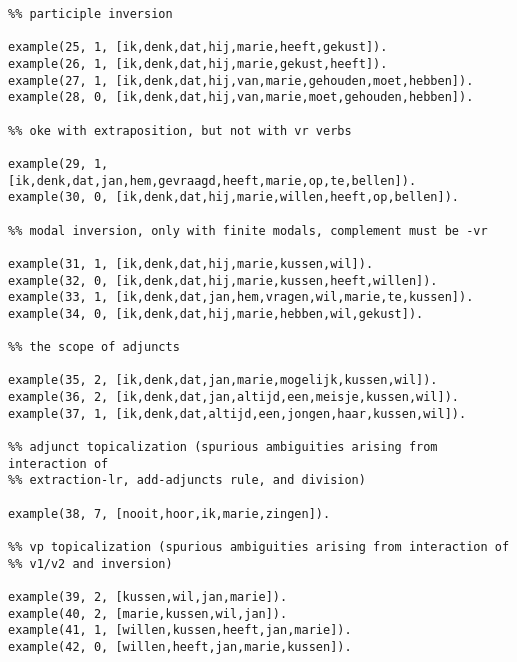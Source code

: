 \begin{verbatim}
%% participle inversion 

example(25, 1, [ik,denk,dat,hij,marie,heeft,gekust]).
example(26, 1, [ik,denk,dat,hij,marie,gekust,heeft]).
example(27, 1, [ik,denk,dat,hij,van,marie,gehouden,moet,hebben]).
example(28, 0, [ik,denk,dat,hij,van,marie,moet,gehouden,hebben]).

%% oke with extraposition, but not with vr verbs

example(29, 1, [ik,denk,dat,jan,hem,gevraagd,heeft,marie,op,te,bellen]).
example(30, 0, [ik,denk,dat,hij,marie,willen,heeft,op,bellen]).

%% modal inversion, only with finite modals, complement must be -vr

example(31, 1, [ik,denk,dat,hij,marie,kussen,wil]).
example(32, 0, [ik,denk,dat,hij,marie,kussen,heeft,willen]).
example(33, 1, [ik,denk,dat,jan,hem,vragen,wil,marie,te,kussen]).
example(34, 0, [ik,denk,dat,hij,marie,hebben,wil,gekust]).

%% the scope of adjuncts

example(35, 2, [ik,denk,dat,jan,marie,mogelijk,kussen,wil]).
example(36, 2, [ik,denk,dat,jan,altijd,een,meisje,kussen,wil]).
example(37, 1, [ik,denk,dat,altijd,een,jongen,haar,kussen,wil]).

%% adjunct topicalization (spurious ambiguities arising from interaction of
%% extraction-lr, add-adjuncts rule, and division)

example(38, 7, [nooit,hoor,ik,marie,zingen]).

%% vp topicalization (spurious ambiguities arising from interaction of 
%% v1/v2 and inversion)

example(39, 2, [kussen,wil,jan,marie]).
example(40, 2, [marie,kussen,wil,jan]).
example(41, 1, [willen,kussen,heeft,jan,marie]).
example(42, 0, [willen,heeft,jan,marie,kussen]).
\end{verbatim}
